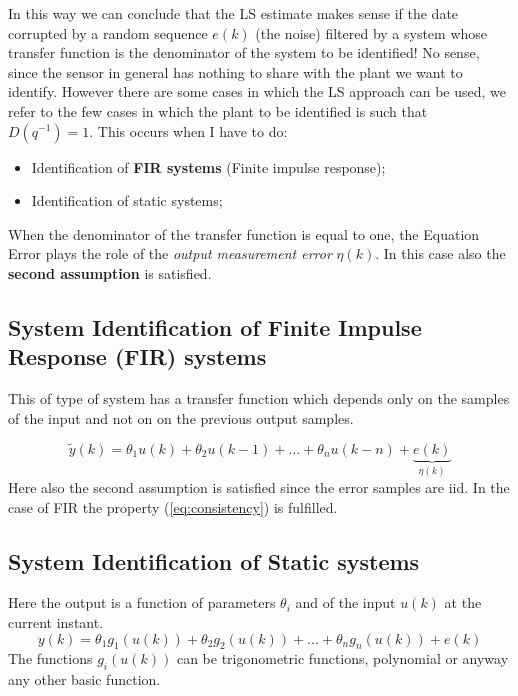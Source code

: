 \noindent
In this way we can conclude that the LS estimate makes sense if the date corrupted by a random sequence $e(k)$ (the noise) filtered by a system whose transfer function is the denominator of the system to be identified! No sense, since the sensor in general has nothing to share with the plant we want to identify. 
However there are some cases in which the LS approach can be used, we refer to the few cases in which the plant to be identified is such that $D(q^{-1})=1$. This occurs when I have to do:
\begin{itemize}
    \itemsep-0.2em
    \item Identification of \textbf{FIR systems} (Finite impulse response); 
    \item Identification of static systems;
\end{itemize}
\noindent
When the denominator of the transfer function is equal to one, the Equation Error plays the role of the \textit{output measurement error} $\eta(k)$. In this case also the \textbf{second assumption} is satisfied.


\subsection{System Identification of Finite Impulse Response (FIR) systems}
This of type of system has a transfer function which depends only on the samples of the input and not on on the previous output samples.

\begin{equation}
    \tilde{y}(k)=\theta_1{u(k)}+\theta_2{u(k-1)}+...+\theta_n{u(k-n)}+
    \underbrace{e(k)}_{\eta(k)}
\end{equation}
Here also the second assumption is satisfied since the error samples are iid. In the case of FIR the property (\ref{eq:consistency}) is fulfilled.

\subsection{System Identification of Static systems}
Here the output is a function of parameters $\theta_i$ and of the input $u(k)$ at the current instant.
\begin{equation}
    y(k)=\theta_1{g_1({u(k)})} + 
    \theta_2{g_2({u(k)})} + ... +
    \theta_n{g_n({u(k)})} + e(k)
\end{equation}
The functions $g_i(u(k))$ can be trigonometric functions, polynomial or anyway any other basic function.

